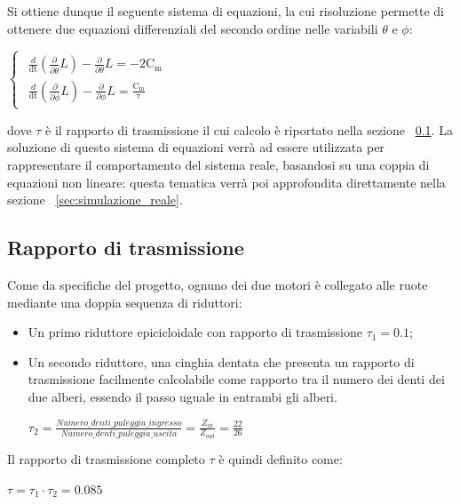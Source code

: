 \newpage
Si ottiene dunque il seguente sistema di equazioni, la cui risoluzione permette di ottenere due equazioni differenziali del secondo ordine nelle variabili $\theta$ e $\phi$:
\begin{center}
	$
	\begin{cases}
		\label{eq:lagrangiana_theta_phi}
		\begin{array}{c}
			\frac{d}{\mathrm{dt}}\left(\frac{\partial }{\partial \dot{\theta} }L\right)-\frac{\partial }{\partial \theta}L=\mathrm{-2 C_m} \\
			\frac{d}{\mathrm{dt}}\left(\frac{\partial }{\partial \dot{\phi} }L\right)-\frac{\partial }{\partial \phi}L=\mathrm{\frac{C_m}{\tau}}
		\end{array}
	\end{cases}
	$
\end{center}
dove $\tau$ è il rapporto di trasmissione il cui calcolo è riportato nella sezione ~\ref{sec:rapp_di_trasmissione}.
La soluzione di questo sistema di equazioni verrà ad essere utilizzata per rappresentare il comportamento del sistema reale, basandosi su una coppia di equazioni non lineare: questa tematica verrà poi approfondita direttamente nella sezione ~\ref{sec:simulazione_reale}.

\subsection{Rapporto di trasmissione}
\label{sec:rapp_di_trasmissione}
Come da specifiche del progetto, ognuno dei due motori è collegato alle ruote mediante una doppia sequenza di riduttori:
\begin{itemize}
	\item Un primo riduttore epicicloidale con rapporto di trasmissione $\tau_1 = 0.1$;
	\item Un secondo riduttore, una cinghia dentata che presenta un rapporto di trasmissione facilmente calcolabile come rapporto tra il numero dei denti dei due alberi, essendo il passo uguale in entrambi gli alberi.
	\begin{center}
		$\tau_2 = \frac{Numero\_denti\_puleggia\_ingresso}{Numero\_denti\_puleggia\_uscita} = \frac{Z_{in}}{Z_{out}} = \frac{22}{26}$
	\end{center}
\end{itemize}

Il rapporto di trasmissione completo $\tau$ è quindi definito come:
\begin{center}
	$\tau = \tau_1 \cdot{\tau_2} = 0.085$	
\end{center}

